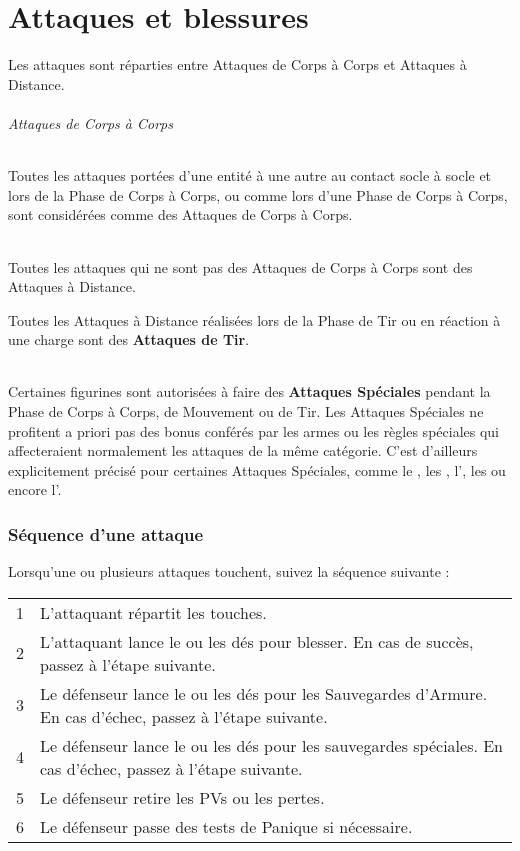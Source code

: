 
\part{Attaques et blessures}
\label{attacks_and_damage}

Les attaques sont réparties entre Attaques de Corps à Corps et Attaques à Distance.

\paragraph{Attaques de Corps à Corps}

Toutes les attaques portées d'une entité à une autre au contact socle à socle et lors de la Phase de Corps à Corps, ou comme lors d'une Phase de Corps à Corps, sont considérées comme des Attaques de Corps à Corps.

\paragraph{}

Toutes les attaques qui ne sont pas des Attaques de Corps à Corps sont des Attaques à Distance.

Toutes les Attaques à Distance réalisées lors de la Phase de Tir ou en réaction à une charge sont des \textbf{Attaques de Tir}.

\paragraph{}

Certaines figurines sont autorisées à faire des \textbf{Attaques Spéciales} pendant la Phase de Corps à Corps, de Mouvement ou de Tir. Les Attaques Spéciales ne profitent a priori pas des bonus conférés par les armes ou les règles spéciales qui affecteraient normalement les attaques de la même catégorie. C'est d'ailleurs explicitement précisé pour certaines Attaques Spéciales, comme le \stomp{}, les \grindingattacks{}, l'\crushattack{}, les \impacthits{} ou encore l'\breathweapon{}.

\section{Séquence d'une attaque}

Lorsqu'une ou plusieurs attaques touchent, suivez la séquence suivante :

\hspace*{0.3cm}
\begin{tabular}{c|m{14cm}}
1 & L'attaquant répartit les touches. \tabularnewline
2 & L'attaquant lance le ou les dés pour blesser. En cas de succès, passez à l'étape suivante. \tabularnewline 
3 & Le défenseur lance le ou les dés pour les Sauvegardes d'Armure. En cas d'échec, passez à l'étape suivante. \tabularnewline
4 & Le défenseur lance le ou les dés pour les sauvegardes spéciales. En cas d'échec, passez à l'étape suivante. \tabularnewline
5 & Le défenseur retire les PVs ou les pertes. \tabularnewline
6 & Le défenseur passe des tests de Panique si nécessaire. \tabularnewline
\end{tabular}

